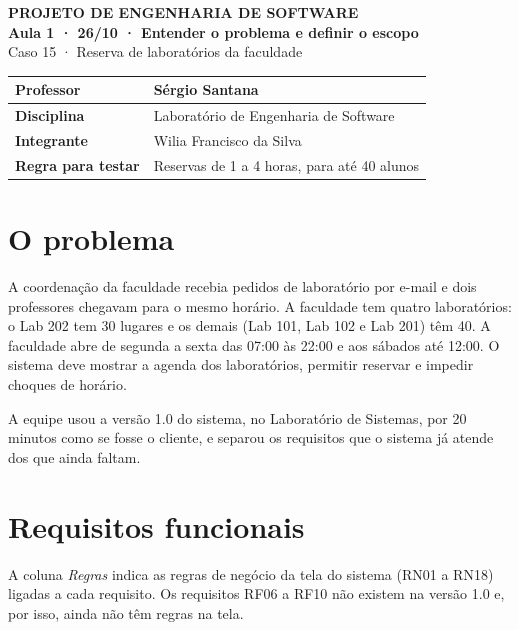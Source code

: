 \documentclass[a4paper,12pt]{article}
\begin{document}
\pagestyle{plain}

\begin{center}
  {\small\bfseries PROJETO DE ENGENHARIA DE SOFTWARE}\\[4pt]
  {\fontsize{16}{20}\selectfont\bfseries Aula 1 · 26/10 · Entender o problema e definir o escopo}\\[6pt]
  {\large Caso 15 · Reserva de laboratórios da faculdade}
\end{center}

\vspace{6pt}

\begin{xltabular}{\linewidth}{|l|Y|}
  \hline
  \textbf{Professor} & Sérgio Santana \\ \hline
  \textbf{Disciplina} & Laboratório de Engenharia de Software \\ \hline
  \textbf{Integrante} & Wilia Francisco da Silva \\ \hline
  \textbf{Regra para testar} & Reservas de 1 a 4 horas, para até 40 alunos \\ \hline
\end{xltabular}

\section{O problema}

A coordenação da faculdade recebia pedidos de laboratório por e-mail e
dois professores chegavam para o mesmo horário. A faculdade tem quatro
laboratórios: o Lab 202 tem 30 lugares e os demais (Lab 101, Lab 102 e
Lab 201) têm 40. A faculdade abre de segunda a sexta das 07:00 às 22:00
e aos sábados até 12:00. O sistema deve mostrar a agenda dos
laboratórios, permitir reservar e impedir choques de horário.

A equipe usou a versão 1.0 do sistema, no Laboratório de Sistemas, por
20 minutos como se fosse o cliente, e separou os requisitos que o
sistema já atende dos que ainda faltam.

\section{Requisitos funcionais}

A coluna \emph{Regras} indica as regras de negócio da tela do sistema
(RN01 a RN18) ligadas a cada requisito. Os requisitos RF06 a RF10 não
existem na versão 1.0 e, por isso, ainda não têm regras na tela.
\end{document}
